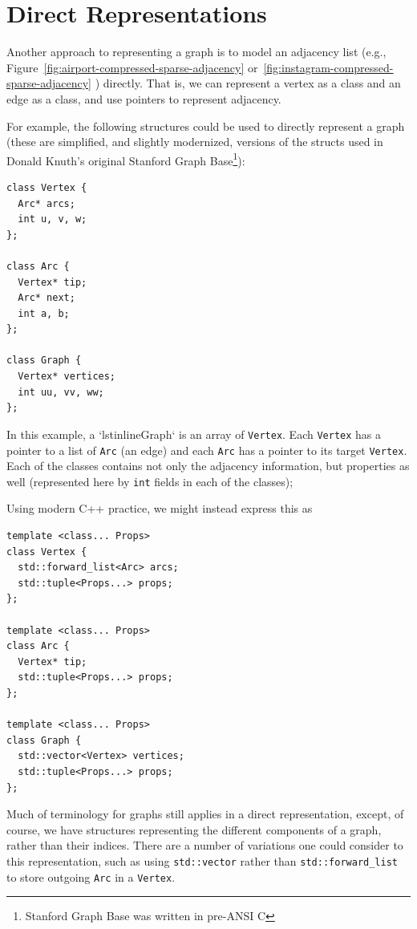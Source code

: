\section{Direct Representations}

Another approach to representing a graph is to model an adjacency list (e.g., Figure~\ref{fig:airport-compressed-sparse-adjacency} or~\ref{fig:instagram-compressed-sparse-adjacency} ) directly.  That is, we can represent a vertex as a class and an edge as a class, and use pointers to represent adjacency.

For example, the following structures could be used to directly represent a graph (these are simplified, and slightly modernized, versions of the structs used in Donald Knuth's original Stanford Graph Base\footnote{Stanford Graph Base was written in pre-ANSI C}):
\begin{lstlisting}
class Vertex {
  Arc* arcs;
  int u, v, w;
};

class Arc {
  Vertex* tip;
  Arc* next;
  int a, b;
};

class Graph {
  Vertex* vertices;
  int uu, vv, ww;
};
\end{lstlisting}  
In this example, a `lstinline{Graph}` is an array of \lstinline{Vertex}.  Each \lstinline{Vertex} has a pointer to a list of \lstinline{Arc} (an edge) and each \lstinline{Arc} has a pointer to its target \lstinline{Vertex}.  Each of the classes contains not only the adjacency information, but properties as well (represented here by \lstinline{int} fields in each of the classes);

Using modern C++ practice, we might instead express this as
\begin{lstlisting}
template <class... Props>
class Vertex {
  std::forward_list<Arc> arcs;
  std::tuple<Props...> props;
};

template <class... Props>
class Arc {
  Vertex* tip;  
  std::tuple<Props...> props;
};

template <class... Props>
class Graph {
  std::vector<Vertex> vertices;
  std::tuple<Props...> props;
};
\end{lstlisting}  

Much of terminology for graphs still applies in a direct representation, except, of course, we have structures representing the different components of a graph, rather than their indices.  There are a number of variations one could consider to this representation, such as using \lstinline{std::vector} rather than \lstinline{std::forward_list} to store outgoing \lstinline{Arc} in a \lstinline{Vertex}.

